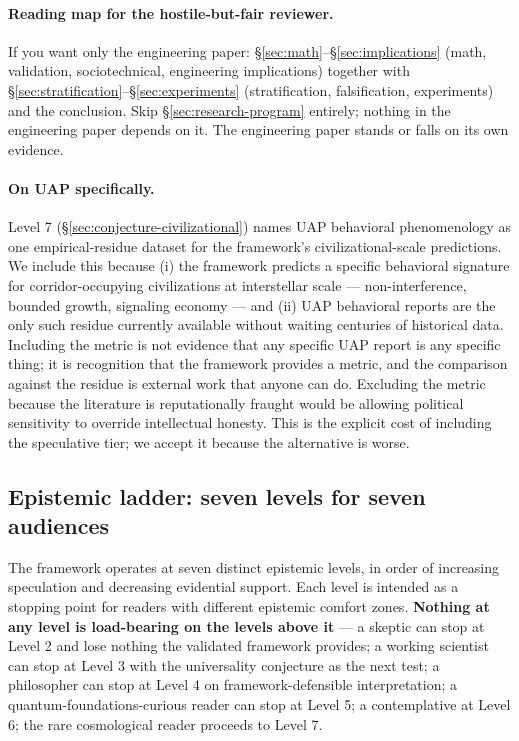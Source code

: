 \documentclass[11pt,a4paper]{article}
\begin{document}
\paragraph{Reading map for the hostile-but-fair reviewer.} If you want only the engineering paper: \S\ref{sec:math}--\S\ref{sec:implications} (math, validation, sociotechnical, engineering implications) together with \S\ref{sec:stratification}--\S\ref{sec:experiments} (stratification, falsification, experiments) and the conclusion. Skip \S\ref{sec:research-program} entirely; nothing in the engineering paper depends on it. The engineering paper stands or falls on its own evidence.

\paragraph{On UAP specifically.} Level 7 (\S\ref{sec:conjecture-civilizational}) names UAP behavioral phenomenology as one empirical-residue dataset for the framework's civilizational-scale predictions. We include this because (i) the framework predicts a specific behavioral signature for corridor-occupying civilizations at interstellar scale --- non-interference, bounded growth, signaling economy --- and (ii) UAP behavioral reports are the only such residue currently available without waiting centuries of historical data. Including the metric is not evidence that any specific UAP report is any specific thing; it is recognition that the framework provides a metric, and the comparison against the residue is external work that anyone can do. Excluding the metric because the literature is reputationally fraught would be allowing political sensitivity to override intellectual honesty. This is the explicit cost of including the speculative tier; we accept it because the alternative is worse.

\subsection{Epistemic ladder: seven levels for seven audiences}
\label{sec:epistemic-ladder}

The framework operates at seven distinct epistemic levels, in order of increasing speculation and decreasing evidential support. Each level is intended as a stopping point for readers with different epistemic comfort zones. \textbf{Nothing at any level is load-bearing on the levels above it} --- a skeptic can stop at Level 2 and lose nothing the validated framework provides; a working scientist can stop at Level 3 with the universality conjecture as the next test; a philosopher can stop at Level 4 on framework-defensible interpretation; a quantum-foundations-curious reader can stop at Level 5; a contemplative at Level 6; the rare cosmological reader proceeds to Level 7.
\end{document}
